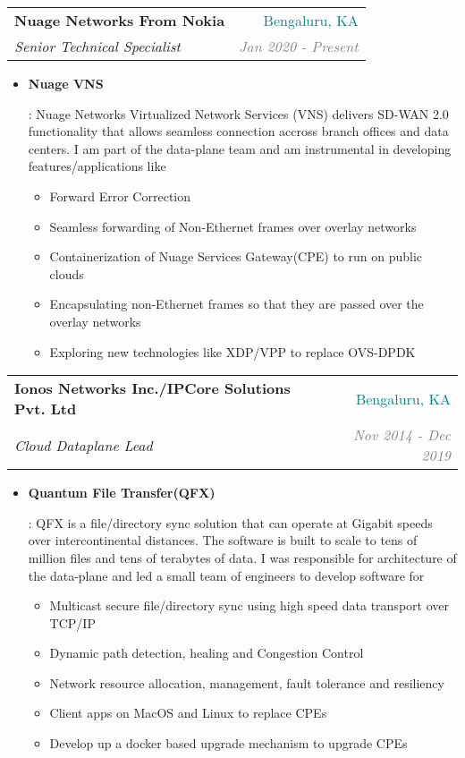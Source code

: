 \documentclass[letterpaper,11pt]{article}
\makeatletter
\newcommand{\resumeItem}[2]{
  \item\small{
    \textbf{#1}{: #2 \vspace{-2pt}}
  }
}
\newcommand{\resumeSubheading}[4]{
  \vspace{-1pt}\item
    \begin{tabular*}{0.97\textwidth}[t]{l@{\extracolsep{\fill}}r}
      \textbf{#1} & #2 \\
      \textit{\small#3} & \textit{\small #4} \\
    \end{tabular*}\vspace{-5pt}
}
\newcommand{\resumeItemListStart}{\begin{itemize}}
\newcommand{\resumeItemListEnd}{\end{itemize}\vspace{-5pt}}
\makeatother
\begin{document}
       \resumeSubheading
      {Nuage Networks From Nokia}{\textcolor{teal}{Bengaluru, KA}}
      {Senior Technical Specialist}{\textcolor{GRAY}{Jan 2020 - Present}}
      \resumeItemListStart
        \resumeItem{Nuage VNS}
          {
           Nuage Networks Virtualized Network Services (VNS) delivers SD-WAN 2.0 functionality that allows seamless connection accross branch offices and data centers. I am part of the data-plane team and am instrumental in developing features/applications like
           \begin{itemize}
           \item {Forward Error Correction}
           \item {Seamless forwarding of Non-Ethernet frames over overlay networks}
           \item {Containerization of Nuage Services Gateway(CPE) to run on public clouds}
           \item {Encapsulating non-Ethernet frames so that they are passed over the overlay networks}
           \item {Exploring new technologies like XDP/VPP to replace OVS-DPDK}
           \end{itemize}}
      \resumeItemListEnd
    \resumeSubheading
      {Ionos Networks Inc./IPCore Solutions Pvt. Ltd}{\textcolor{teal}{Bengaluru, KA}}
      {Cloud Dataplane Lead}{\textcolor{GRAY}{Nov 2014 - Dec 2019}}
      \resumeItemListStart
        \resumeItem{Quantum File Transfer(QFX)}
          {
           QFX is a file/directory sync solution that can operate at Gigabit speeds over intercontinental distances. The software is built to scale to tens of  million files and tens of  terabytes of data. I was responsible for architecture of the data-plane and led a small team of engineers to develop software for
           
           \begin{itemize}
           \item {Multicast secure file/directory sync using high speed data transport over TCP/IP}
           \item {Dynamic path detection, healing and Congestion Control}
           \item {Network resource allocation, management, fault tolerance and resiliency}
           \item {Client apps on MacOS and Linux to replace CPEs}
           \item {Develop up a docker based upgrade mechanism to upgrade CPEs}
           \end{itemize}}
      \resumeItemListEnd
\end{document}
